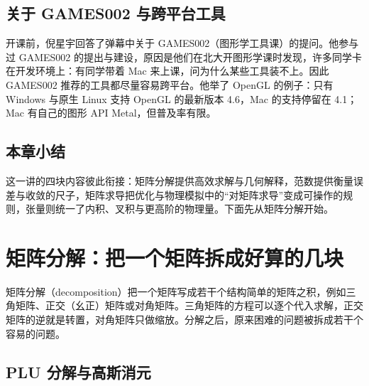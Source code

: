 \documentclass[a4paper]{article}
\begin{document}
\subsection{关于 GAMES002 与跨平台工具}

开课前，倪星宇回答了弹幕中关于 GAMES002（图形学工具课）的提问。他参与过 GAMES002 的提出与建设，原因是他们在北大开图形学课时发现，许多同学卡在开发环境上：有同学带着 Mac 来上课，问为什么某些工具装不上。因此 GAMES002 推荐的工具都尽量容易跨平台。他举了 OpenGL 的例子：只有 Windows 与原生 Linux 支持 OpenGL 的最新版本 4.6，Mac 的支持停留在 4.1；Mac 有自己的图形 API Metal，但普及率有限。

\subsection{本章小结}

这一讲的四块内容彼此衔接：矩阵分解提供高效求解与几何解释，范数提供衡量误差与收敛的尺子，矩阵求导把优化与物理模拟中的“对矩阵求导”变成可操作的规则，张量则统一了内积、叉积与更高阶的物理量。下面先从矩阵分解开始。

\section{矩阵分解：把一个矩阵拆成好算的几块}

矩阵分解（decomposition）把一个矩阵写成若干个结构简单的矩阵之积，例如三角矩阵、正交（幺正）矩阵或对角矩阵。三角矩阵的方程可以逐个代入求解，正交矩阵的逆就是转置，对角矩阵只做缩放。分解之后，原来困难的问题被拆成若干个容易的问题。

\subsection{PLU 分解与高斯消元}
\end{document}

